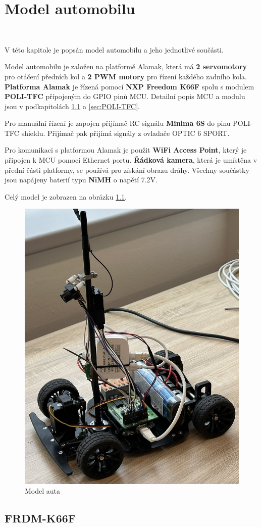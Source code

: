 \chapter{Model automobilu}
\label{sec:CarModel}\

V této kapitole je popsán model automobilu a jeho jednotlivé 
součásti.

Model automobilu je založen na platformě Alamak, která má
\textbf{2 servomotory} pro otáčení předních kol a
\textbf{2 PWM motory} pro řízení každého
zadního kola. 
\textbf{Platforma Alamak} je řízená pomocí \textbf{NXP Freedom K66F}\cite{frdmk66UserGuide} spolu
s modulem \textbf{POLI-TFC} přípojeným do GPIO pinů MCU.
Detailní popis MCU a modulu jsou v podkapitolách \ref{sec:FRDM-K66F}
a \ref{sec:POLI-TFC}.

Pro manuální řízení je zapojen přijímač RC signálu \textbf{Minima 6S} do pinu POLI-TFC shieldu. Přijímač pak přijímá signály z
ovladače OPTIC 6 SPORT.

Pro komunikaci s platformou Alamak je použit \textbf{WiFi Access Point}, který je připojen k MCU pomocí Ethernet portu. \textbf{Řádková kamera}, která je umístěna v přední části platformy,
se používá pro získání obrazu dráhy. Všechny součástky jsou
napájeny baterií typu \textbf{NiMH} o napětí 7.2V.

Celý model je zobrazen na obrázku \ref{fig:car}.
\begin{figure}[!h]
    \vspace{-10pt}
    \centering
    \includegraphics[width = .45\linewidth]{Figures/Car.jpeg}
    \caption{Model auta}
    \label{fig:car}
    \vspace{-10pt}
\end{figure}

\section{FRDM-K66F}
\label{sec:FRDM-K66F}\

